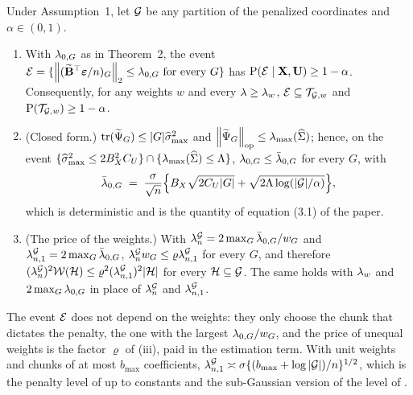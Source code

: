 \begin{lemma}
\label{lem:calib-blocks}
Under Assumption~1, let $\mathcal{G}$ be any partition of the penalized coordinates
and $\alpha \in (0,1)$.
\begin{enumerate}
\item[(i)] With $\lambda_{0,G}$ as in Theorem~2, the event
$\mathcal{E} = \{\left\lVert (\widetilde{\mathbf{B}}^{\top}\boldsymbol{\varepsilon}/n)_{G} \right\rVert_{2} \le \lambda_{0,G} \text{ for every } G\}$
has $\mathrm{P}(\mathcal{E}\mid\mathbf{X},\mathbf{U}) \ge 1-\alpha$. Consequently, for any weights $w$
and every $\lambda \ge \lambda_{w}$, $\mathcal{E} \subseteq \mathcal{T}_{\mathcal{G},w}$ and
$\mathrm{P}(\mathcal{T}_{\mathcal{G},w}) \ge 1-\alpha$.
\item[(ii)] (Closed form.) $\mathrm{tr}(\widetilde{\Psi}_{G}) \le |G|\widehat{\sigma}_{\max}^{2}$ and
$\left\lVert \widetilde{\Psi}_{G} \right\rVert_{\mathrm{op}} \le \lambda_{\max}(\widehat{\Sigma})$; hence, on the event
$\{\widehat{\sigma}_{\max}^{2} \le 2B_X^{2}C_U\}\cap\{\lambda_{\max}(\widehat{\Sigma}) \le \Lambda\}$,
$\lambda_{0,G} \le \bar{\lambda}_{0,G}$ for every $G$, with
\[
  \bar{\lambda}_{0,G} \;=\; \frac{\sigma}{\sqrt{n}}\Bigl\{B_X\sqrt{2C_U|G|}
  + \sqrt{2\Lambda\log(|\mathcal{G}|/\alpha)}\Bigr\},
\]
which is deterministic and is the quantity of equation (3.1) of the paper.
\item[(iii)] (The price of the weights.) With
$\lambda^{\mathcal{G}}_{n} = 2\max_{G}\bar{\lambda}_{0,G}/w_{G}$ and $\lambda^{\mathcal{G}}_{n,1} = 2\max_{G}\bar{\lambda}_{0,G}$,
$\lambda^{\mathcal{G}}_{n} w_{G} \le \varrho\lambda^{\mathcal{G}}_{n,1}$ for every $G$, and therefore
$(\lambda^{\mathcal{G}}_{n})^{2}\mathcal{W}(\mathcal{H}) \le \varrho^{2}(\lambda^{\mathcal{G}}_{n,1})^{2}|\mathcal{H}|$ for every
$\mathcal{H} \subseteq \mathcal{G}$. The same holds with $\lambda_{w}$ and
$2\max_{G}\lambda_{0,G}$ in place of $\lambda^{\mathcal{G}}_{n}$ and $\lambda^{\mathcal{G}}_{n,1}$.
\end{enumerate}
\end{lemma}

The event $\mathcal{E}$ does not depend on the weights: they only choose the chunk
that dictates the penalty, the one with the largest $\lambda_{0,G}/w_{G}$, and the
price of unequal weights is the factor $\varrho$ of (iii), paid in the
estimation term. With unit weights and chunks of at most $b_{\max}$
coefficients, $\lambda^{\mathcal{G}}_{n,1} \asymp \sigma\{(b_{\max} + \log|\mathcal{G}|)/n\}^{1/2}$,
which is the penalty level of \citet[eq.~3.14]{Klopp-Pensky-2015} up to
constants and the sub-Gaussian version of the level of
\citet[Lemma~3.1]{Lounici-Pontil-vandeGeer-Tsybakov-2011}.

